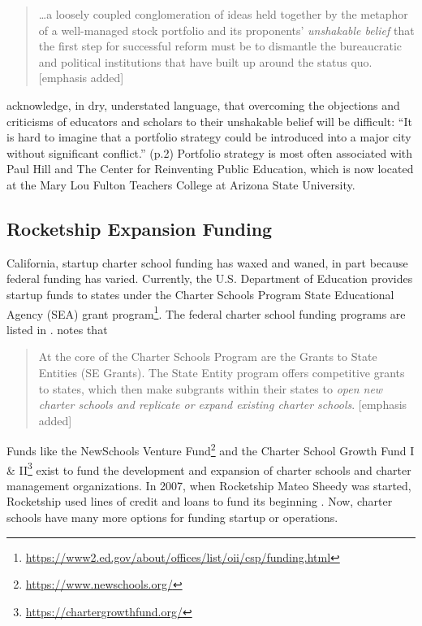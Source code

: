 \bigskip\begin{quote}\OnehalfSpacing%
  \ldots a loosely coupled conglomeration of ideas held together by the metaphor of a well-managed stock portfolio and its proponents’ \textit{unshakable belief} that the first step for successful reform must be to dismantle the bureaucratic and political institutions that have built up around the status quo. [emphasis added] 
\end{quote}

\citeauthor{Hill.etal2009} acknowledge, in dry, understated language, that overcoming the objections and criticisms of educators and scholars to their unshakable belief will be difficult: ``It is hard to imagine that a portfolio strategy could be introduced into a major city without significant conflict.'' (p.2) Portfolio strategy is most often associated with Paul Hill and The Center for Reinventing Public Education, which is now located at the Mary Lou Fulton Teachers College at Arizona State University.

\subsection{Rocketship Expansion Funding}\label{sec:rocketship-expansion-funding}\indent

California, startup charter school funding has waxed and waned, in part because federal funding has varied. Currently, the U.S. Department of Education provides startup funds to states under the Charter Schools Program State Educational Agency (SEA) grant program\footnote{\url{https://www2.ed.gov/about/offices/list/oii/csp/funding.html}}. The federal charter school funding programs are listed in \textcite{NCSRC2020}.  notes that 

\bigskip\begin{quote}\OnehalfSpacing%
  At the core of the Charter Schools Program are the Grants to State Entities (SE Grants). The State Entity program offers competitive grants to states, which then make subgrants within their states to \textit{open new charter schools and replicate or expand existing charter schools}. [emphasis added] \\
\end{quote}

Funds like the NewSchools Venture Fund\footnote{\url{https://www.newschools.org/}} and the Charter School Growth Fund I \& II\footnote{\url{https://chartergrowthfund.org/}} exist to fund the development and expansion of charter schools and charter management organizations. In 2007, when Rocketship Mateo Sheedy was started, Rocketship used lines of credit and loans to fund its beginning \parencite[260]{Danner2006}. Now, charter schools have many more options for funding startup or operations.

